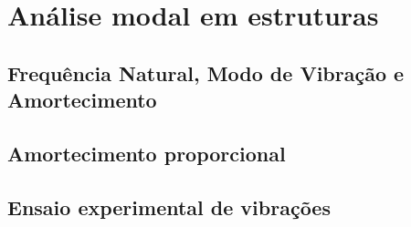 \section{Análise modal em estruturas}

\subsection{Frequência Natural, Modo de Vibração e Amortecimento}

\subsection{Amortecimento proporcional}

\subsection{Ensaio experimental de vibrações}







